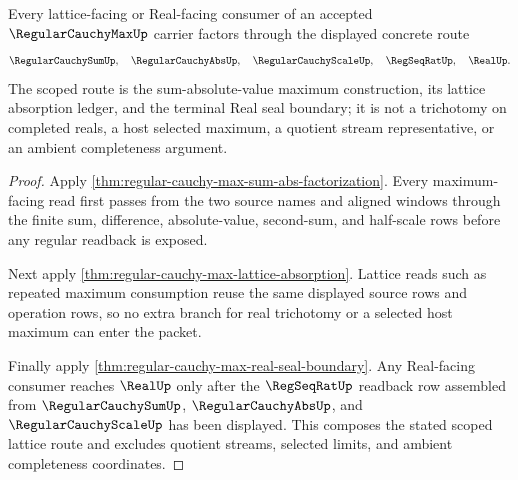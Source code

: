 \begin{theorem}
\label{thm:regular-cauchy-max-scoped-lattice-route}
Every lattice-facing or Real-facing consumer of an accepted $\RegularCauchyMaxUp$ carrier factors through the displayed concrete route
$$
\RegularCauchySumUp,\quad
\RegularCauchyAbsUp,\quad
\RegularCauchyScaleUp,\quad
\RegSeqRatUp,\quad
\RealUp .
$$
The scoped route is the sum-absolute-value maximum construction, its lattice absorption ledger, and the terminal Real seal boundary; it is not a trichotomy on completed reals, a host selected maximum, a quotient stream representative, or an ambient completeness argument.
\end{theorem}
\begin{proof}
Apply \autoref{thm:regular-cauchy-max-sum-abs-factorization}. Every maximum-facing read first passes from the two source names and aligned windows through the finite sum, difference, absolute-value, second-sum, and half-scale rows before any regular readback is exposed.

Next apply \autoref{thm:regular-cauchy-max-lattice-absorption}. Lattice reads such as repeated maximum consumption reuse the same displayed source rows and operation rows, so no extra branch for real trichotomy or a selected host maximum can enter the packet.

Finally apply \autoref{thm:regular-cauchy-max-real-seal-boundary}. Any Real-facing consumer reaches $\RealUp$ only after the $\RegSeqRatUp$ readback row assembled from $\RegularCauchySumUp$, $\RegularCauchyAbsUp$, and $\RegularCauchyScaleUp$ has been displayed. This composes the stated scoped lattice route and excludes quotient streams, selected limits, and ambient completeness coordinates.
\end{proof}

